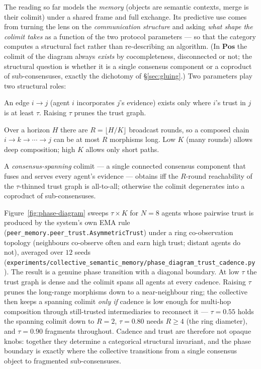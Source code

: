 \documentclass{article}
\newcommand{\method}[1]{\texttt{#1}}
\begin{document}
The reading so far models the \emph{memory} (objects are semantic contexts,
merge is their colimit) under a shared frame and full exchange. Its
predictive use comes from turning the lens on the \emph{communication
structure} and asking \emph{what shape the colimit takes} as a function of
the two protocol parameters --- so that the category computes a structural
fact rather than re-describing an algorithm. (In $\mathbf{Pos}$ the colimit
of the diagram always \emph{exists} by cocompleteness, disconnected or not;
the structural question is whether it is a single consensus component or a
coproduct of sub-consensuses, exactly the dichotomy of \S\ref{sec:gluing}.) Two parameters play two structural roles:
\begin{description}[leftmargin=12pt,topsep=2pt,itemsep=1pt]
\item[Trust $\tau$ gates morphisms.] An edge $i\!\to\!j$ (agent $i$
incorporates $j$'s evidence) exists only where $i$'s trust in $j$ is at least
$\tau$. Raising $\tau$ prunes the trust graph.
\item[Cadence $K$ gates composition depth.] Over a horizon $H$ there are
$R=\lfloor H/K\rfloor$ broadcast rounds, so a composed chain
$i\!\to\!k\!\to\!\cdots\!\to\!j$ can be at most $R$ morphisms long. Low $K$
(many rounds) allows deep composition; high $K$ allows only short paths.
\end{description}
A \emph{consensus-spanning} colimit --- a single connected consensus
component that fuses and serves every agent's evidence --- obtains iff the
$R$-round reachability of the $\tau$-thinned trust graph is all-to-all;
otherwise the colimit degenerates into a coproduct of sub-consensuses.

Figure~\ref{fig:phase-diagram} sweeps $\tau\times K$ for $N{=}8$ agents whose
pairwise trust is produced by the system's own EMA rule
(\method{peer\_memory.peer\_trust.AsymmetricTrust}) under a ring co-observation
topology (neighbours co-observe often and earn high trust; distant agents do
not), averaged over $12$ seeds
(\method{experiments/collective\_semantic\_memory/phase\_diagram\_trust\_cadence.py}).
The result is a genuine phase transition with a diagonal boundary. At low
$\tau$ the trust graph is dense and the colimit spans all agents at every
cadence. Raising $\tau$ prunes the long-range morphisms down to a
near-neighbour ring; the collective then keeps a spanning colimit \emph{only
if} cadence is low enough for multi-hop composition through still-trusted
intermediaries to reconnect it ---
$\tau{=}0.55$ holds the spanning colimit down to $R{=}2$, $\tau{=}0.80$ needs $R\ge4$
(the ring diameter), and $\tau{=}0.90$ fragments throughout. Cadence and trust
are therefore not opaque knobs: together they determine a categorical
structural invariant, and the phase boundary is exactly where the collective
transitions from a single consensus object to fragmented sub-consensuses.
\end{document}
